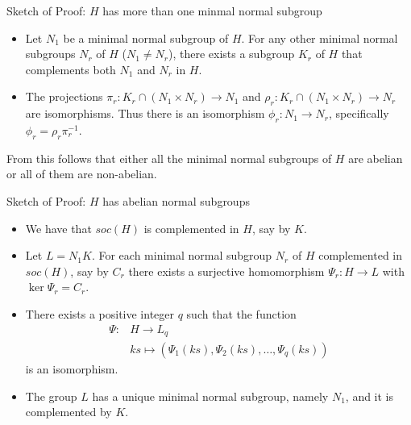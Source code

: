 \documentclass{beamer}
\begin{document}
\begin{frame}{Sketch of Proof: $H$ has more than one minmal normal subgroup}
    \begin{itemize}
        \item Let $N_1$ be a minimal normal subgroup of $H$. For any other minimal normal subgroups $N_r$ of $H$ ($N_1 \ne N_r$), there exists a subgroup $K_r$ of $H$ that complements both $N_1$ and $N_r$ in $H$.
        \item<2-> The projections $\pi_r : K_r \cap (N_1 \times N_r) \rightarrow N_1$ and $\rho_r : K_r \cap (N_1 \times N_r) \rightarrow N_r$ are isomorphisms. Thus there is an isomorphism $\phi_r : N_1 \rightarrow N_r$, specifically $\phi_r = \rho_r\pi_r^{-1}$.
    \end{itemize}
     From this follows that either all the minimal normal subgroups of $H$ are abelian or all of them are non-abelian.
\end{frame}

\begin{frame}{Sketch of Proof: $H$ has abelian normal subgroups}
    \begin{itemize}
        \item We have that $soc(H)$ is complemented in $H$, say by $K$.
        \item<2-> Let $L = N_1K$. For each minimal normal subgroup $N_r$ of $H$ complemented in $soc(H)$, say by $C_r$ there exists a surjective homomorphism $\Psi_r \colon H \rightarrow L$ with $\ker \Psi_r = C_r$.
        \item<3-> There exists a positive integer $q$ such that the function 
        \begin{align*}
            \Psi \colon &H \longrightarrow L_q \\
                     &ks \mapsto  (\Psi_1(ks),\Psi_2(ks),\ldots ,\Psi_q(ks))
        \end{align*} is an isomorphism.
        \item<4-> The group $L$ has a unique minimal normal subgroup, namely $N_1$, and it is complemented by $K$.
    \end{itemize}
\end{frame}
\end{document}
